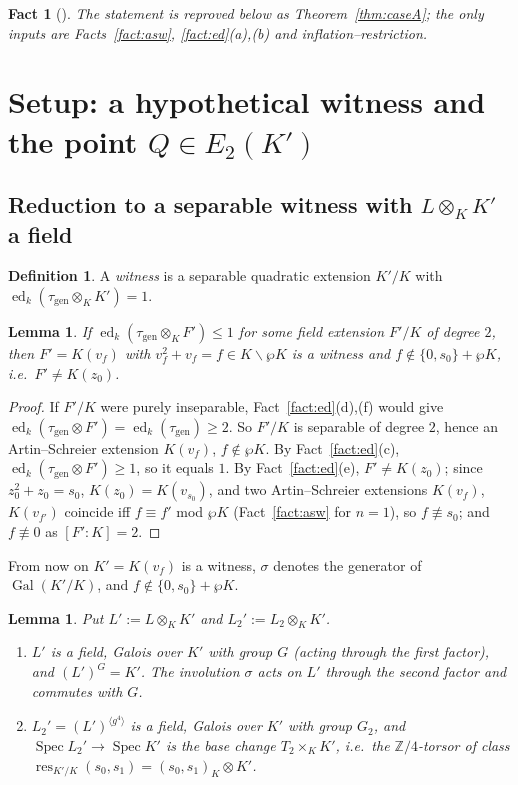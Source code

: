 \documentclass[11pt]{amsart}
\newtheorem{lemma}[theorem]{Lemma}
\newtheorem{fact}[theorem]{Fact}
\theoremstyle{definition}
\newtheorem{definition}[theorem]{Definition}
\theoremstyle{remark}
\newcommand{\ed}{\operatorname{ed}}
\newcommand{\gen}{\mathrm{gen}}
\newcommand{\Z}{\mathbb Z}
\newcommand{\res}{\operatorname{res}}
\newcommand{\Spec}{\operatorname{Spec}}
\newcommand{\Gal}{\operatorname{Gal}}
\begin{document}
\begin{fact}[{\cite[Theorem 11.6]{A}}]\label{fact:caseA}
The statement is reproved below as Theorem~\ref{thm:caseA}; the only inputs are
Facts~\ref{fact:asw}, \ref{fact:ed}(a),(b) and inflation--restriction.
\end{fact}

\section{Setup: a hypothetical witness and the point \texorpdfstring{$Q\in E_2(K')$}{Q in E2(K')}}\label{sec:setup}

\subsection{Reduction to a separable witness with \texorpdfstring{$L\otimes_KK'$}{L(x)K'} a field}

\begin{definition}\label{def:witness}
A \emph{witness} is a separable quadratic extension $K'/K$ with
$\ed_k(\tau_{\gen}\otimes_KK')=1$.
\end{definition}

\begin{lemma}\label{lem:reduce}
If $\ed_k(\tau_{\gen}\otimes_KF')\le1$ for some field extension $F'/K$ of degree $2$,
then $F'=K(v_f)$ with $v_f^2+v_f=f\in K\smallsetminus\wp K$ is a witness and
$f\notin\{0,s_0\}+\wp K$, i.e.\ $F'\ne K(z_0)$.
\end{lemma}

\begin{proof}
If $F'/K$ were purely inseparable, Fact~\ref{fact:ed}(d),(f) would give
$\ed_k(\tau_{\gen}\otimes F')=\ed_k(\tau_{\gen})\ge2$. So $F'/K$ is separable of degree
$2$, hence an Artin--Schreier extension $K(v_f)$, $f\notin\wp K$. By Fact~\ref{fact:ed}(c),
$\ed_k(\tau_{\gen}\otimes F')\ge1$, so it equals $1$. By Fact~\ref{fact:ed}(e), $F'\ne K(z_0)$;
since $z_0^2+z_0=s_0$, $K(z_0)=K(v_{s_0})$, and two Artin--Schreier extensions $K(v_f)$,
$K(v_{f'})$ coincide iff $f\equiv f'$ mod $\wp K$ (Fact~\ref{fact:asw} for $n=1$), so
$f\not\equiv s_0$; and $f\not\equiv0$ as $[F':K]=2$.
\end{proof}

From now on $K'=K(v_f)$ is a witness, $\sigma$ denotes the generator of
$\Gal(K'/K)$, and $f\notin\{0,s_0\}+\wp K$.

\begin{lemma}\label{lem:Lprime}
Put $L':=L\otimes_KK'$ and $L_2':=L_2\otimes_KK'$.
\begin{enumerate}[label=\textup{(\alph*)}]
\item $L'$ is a field, Galois over $K'$ with group $G$ (acting through the first factor),
and $(L')^G=K'$. The involution $\sigma$ acts on $L'$ through the second factor and
commutes with $G$.
\item $L_2'=(L')^{\langle g^4\rangle}$ is a field, Galois over $K'$ with group $G_2$, and
$\Spec L_2'\to\Spec K'$ is the base change $T_2\times_KK'$, i.e.\ the $\Z/4$-torsor of
class $\res_{K'/K}(s_0,s_1)=(s_0,s_1)_K\otimes K'$.
\end{enumerate}
\end{lemma}
\end{document}

